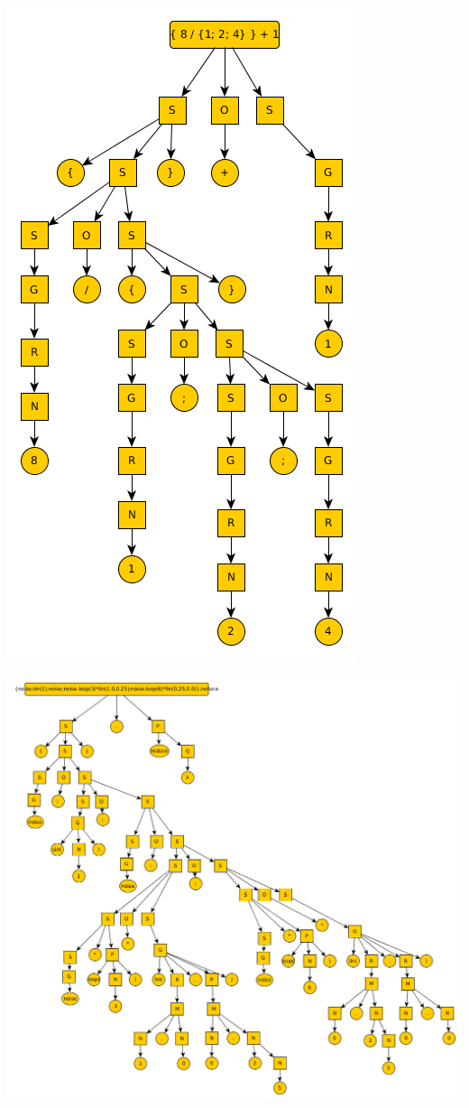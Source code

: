 \documentclass[a4paper,titlepage,10pt]{article}
\begin{document}
\centerline{\includegraphics[scale=0.5]{arbolDerivacion2.png}}   

\centerline{\includegraphics[scale=0.5]{arbolDerivacion.png}}   
\end{document}
